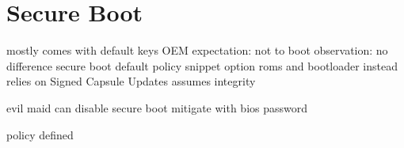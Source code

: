 
\section{Secure Boot}
mostly comes with default keys OEM
expectation:
not to boot
observation:
no difference
secure boot default policy snippet
option roms and bootloader
instead relies on Signed Capsule Updates
assumes integrity

\cite[32.3]{uefi-spec}

evil maid can disable secure boot
mitigate with bios password

policy defined
\cite[32.5.3.3 Authorization Process]{uefi-spec}